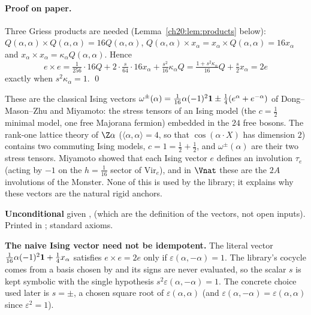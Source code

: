 \paragraph{Proof on paper.}  Three Griess products are needed (Lemma~\ref{ch20:lem:products} below):
$Q(\alpha,\alpha)\times Q(\alpha,\alpha)=16Q(\alpha,\alpha)$, $Q(\alpha,\alpha)\times x_\alpha=x_\alpha\times Q(\alpha,\alpha)=16x_\alpha$ and
$x_\alpha\times x_\alpha=\kappa_\alpha Q(\alpha,\alpha)$.  Hence
\begin{equation*}
  e\times e=\tfrac1{256}\cdot16Q+2\cdot\tfrac{s}{64}\cdot16x_\alpha+\tfrac{s^2}{16}\kappa_\alpha Q
  =\tfrac{1+s^2\kappa_\alpha}{16}Q+\tfrac s2x_\alpha=2e
\end{equation*}
exactly when $s^2\kappa_\alpha=1$. \qed
\begin{physics}
These are the classical Ising vectors $\omega^\pm(\alpha)=\tfrac1{16}\alpha(-1)^2\mathbf 1\pm\tfrac14(e^\alpha+e^{-\alpha})$ of
Dong--Mason--Zhu and Miyamoto: the stress tensors of an Ising model (the $c=\tfrac12$ minimal model, one free Majorana
fermion) embedded in the $24$ free bosons.  The rank-one lattice theory of $\Z\alpha$ ($\langle\alpha,\alpha\rangle=4$, so that
$\cos(\alpha\cdot X)$ has dimension $2$) contains two commuting Ising models, $c=1=\tfrac12+\tfrac12$, and $\omega^\pm(\alpha)$ are
their two stress tensors.  Miyamoto showed that each Ising vector $e$ defines an involution $\tau_e$ (acting by $-1$ on the
$h=\tfrac1{16}$ sector of $\mathrm{Vir}_e$), and in $\Vnat$ these are the $2A$ involutions of the Monster.  None of this
is used by the library; it explains why these vectors are the natural rigid anchors.
\end{physics}
\begin{status}
\textbf{Unconditional} given ,  (which are the definition of the vectors, not open inputs).  Printed in
; standard axioms.
\end{status}

\begin{warning}
\textbf{The naive Ising vector need not be idempotent.}  The literal vector
$\tfrac1{16}\alpha(-1)^2\mathbf 1+\tfrac14x_\alpha$ satisfies $e\times e=2e$ only if $\varepsilon(\alpha,-\alpha)=1$.  The library's
cocycle comes from a basis chosen by  and its signs are never evaluated, so the scalar
$s$ is kept symbolic with the single hypothesis $s^2\varepsilon(\alpha,-\alpha)=1$.  The concrete choice used later is
$s=\pm$, a chosen square root of $\varepsilon(\alpha,\alpha)$ (and $\varepsilon(\alpha,-\alpha)=\varepsilon(\alpha,\alpha)$
since $\varepsilon^2=1$).
\end{warning}

